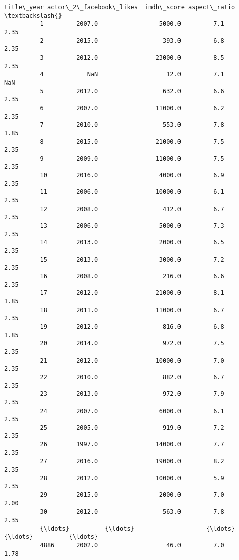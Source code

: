 \documentclass[11pt]{article}
\begin{document}
\begin{Verbatim}[commandchars=\\\{\}]
                title\_year actor\_2\_facebook\_likes  imdb\_score aspect\_ratio  \textbackslash{}
          1         2007.0                 5000.0         7.1         2.35   
          2         2015.0                  393.0         6.8         2.35   
          3         2012.0                23000.0         8.5         2.35   
          4            NaN                   12.0         7.1          NaN   
          5         2012.0                  632.0         6.6         2.35   
          6         2007.0                11000.0         6.2         2.35   
          7         2010.0                  553.0         7.8         1.85   
          8         2015.0                21000.0         7.5         2.35   
          9         2009.0                11000.0         7.5         2.35   
          10        2016.0                 4000.0         6.9         2.35   
          11        2006.0                10000.0         6.1         2.35   
          12        2008.0                  412.0         6.7         2.35   
          13        2006.0                 5000.0         7.3         2.35   
          14        2013.0                 2000.0         6.5         2.35   
          15        2013.0                 3000.0         7.2         2.35   
          16        2008.0                  216.0         6.6         2.35   
          17        2012.0                21000.0         8.1         1.85   
          18        2011.0                11000.0         6.7         2.35   
          19        2012.0                  816.0         6.8         1.85   
          20        2014.0                  972.0         7.5         2.35   
          21        2012.0                10000.0         7.0         2.35   
          22        2010.0                  882.0         6.7         2.35   
          23        2013.0                  972.0         7.9         2.35   
          24        2007.0                 6000.0         6.1         2.35   
          25        2005.0                  919.0         7.2         2.35   
          26        1997.0                14000.0         7.7         2.35   
          27        2016.0                19000.0         8.2         2.35   
          28        2012.0                10000.0         5.9         2.35   
          29        2015.0                 2000.0         7.0         2.00   
          30        2012.0                  563.0         7.8         2.35   
          {\ldots}          {\ldots}                    {\ldots}         {\ldots}          {\ldots}   
          4886      2002.0                   46.0         7.0         1.78   

\end{Verbatim}
\end{document}
